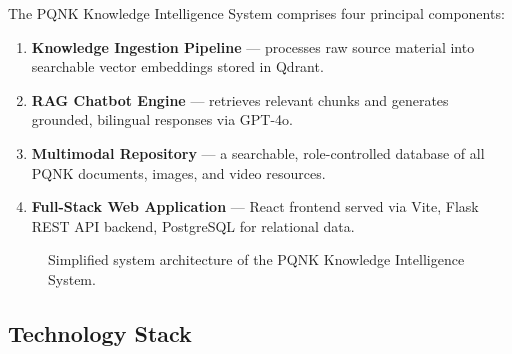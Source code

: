 \documentclass[12pt, a4paper]{article}
\begin{document}
\begin{onehalfspacing}
The PQNK Knowledge Intelligence System comprises four principal components:

\begin{enumerate}[noitemsep]
  \item \textbf{Knowledge Ingestion Pipeline} --- processes raw source material
    into searchable vector embeddings stored in Qdrant.
  \item \textbf{RAG Chatbot Engine} --- retrieves relevant chunks and generates
    grounded, bilingual responses via GPT-4o.
  \item \textbf{Multimodal Repository} --- a searchable, role-controlled database
    of all PQNK documents, images, and video resources.
  \item \textbf{Full-Stack Web Application} --- React frontend served via Vite,
    Flask REST API backend, PostgreSQL for relational data.
\end{enumerate}

\begin{figure}[H]
\centering
{}
\caption{Simplified system architecture of the PQNK Knowledge Intelligence System.}
\end{figure}

\subsection{Technology Stack}


\end{onehalfspacing}
\end{document}
